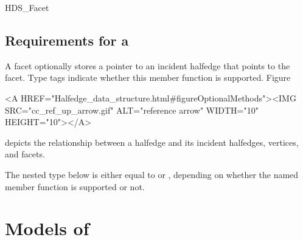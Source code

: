 \begin{ccClass}{HDS_Facet}
\subsection{Requirements for a \protect{}}
\label{sectionHdsFacet}


\ccDefinition

A facet optionally stores a pointer to an incident halfedge that
points to the facet. Type tags indicate whether this member function
is supported.  
Figure~\ccTexHtml{\ref{figureOptionalMethods}}{}\begin{ccHtmlOnly}
  <A HREF="Halfedge_data_structure.html#figureOptionalMethods"><IMG 
  SRC="cc_ref_up_arrow.gif" ALT="reference arrow" WIDTH="10" HEIGHT="10"></A>
\end{ccHtmlOnly}
depicts the relationship between a halfedge and its incident
halfedges, vertices, and facets.


\ccTypes

\ccGlue
{}
\ccGlue
{}


\ccOperations

\ccGlue
{}
\ccGlue
{}



The nested type below is either equal to  or
, depending on whether the named member function is
supported or not. 


\end{ccClass}

\ccTagDefaults



\section{Models of \protect{}}
\label{sectionHdsModels}

